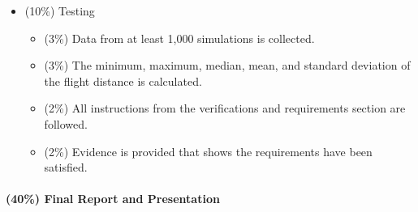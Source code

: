 \documentclass[12pt]{article}
\begin{document}
\begin{itemize}
\item (10\%) Testing
\begin{itemize}
\item (3\%) Data from at least 1,000 simulations is collected.
\item (3\%) The minimum, maximum, median, mean, and standard deviation of the flight distance is calculated.
\item (2\%) All instructions from the verifications and requirements section are followed.
\item (2\%) Evidence is provided that shows the requirements have been satisfied.
\end{itemize}

\end{itemize}

\paragraph{(40\%) Final Report and Presentation}
\end{document}
